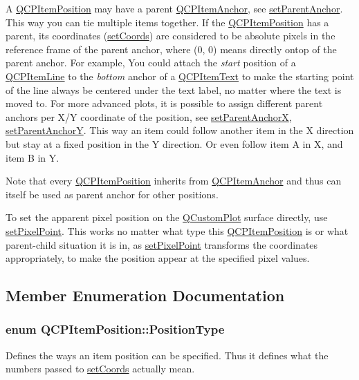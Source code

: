 \-A \hyperlink{classQCPItemPosition}{\-Q\-C\-P\-Item\-Position} may have a parent \hyperlink{classQCPItemAnchor}{\-Q\-C\-P\-Item\-Anchor}, see \hyperlink{classQCPItemPosition_ac094d67a95d2dceafa0d50b9db3a7e51}{set\-Parent\-Anchor}. \-This way you can tie multiple items together. \-If the \hyperlink{classQCPItemPosition}{\-Q\-C\-P\-Item\-Position} has a parent, its coordinates (\hyperlink{classQCPItemPosition_aa988ba4e87ab684c9021017dcaba945f}{set\-Coords}) are considered to be absolute pixels in the reference frame of the parent anchor, where (0, 0) means directly ontop of the parent anchor. \-For example, \-You could attach the {\itshape start\/} position of a \hyperlink{classQCPItemLine}{\-Q\-C\-P\-Item\-Line} to the {\itshape bottom\/} anchor of a \hyperlink{classQCPItemText}{\-Q\-C\-P\-Item\-Text} to make the starting point of the line always be centered under the text label, no matter where the text is moved to. \-For more advanced plots, it is possible to assign different parent anchors per \-X/\-Y coordinate of the position, see \hyperlink{classQCPItemPosition_add71461a973927c74e42179480916d9c}{set\-Parent\-Anchor\-X}, \hyperlink{classQCPItemPosition_add5ec1db9d19cec58a3b5c9e0a0c3f9d}{set\-Parent\-Anchor\-Y}. \-This way an item could follow another item in the \-X direction but stay at a fixed position in the \-Y direction. \-Or even follow item \-A in \-X, and item \-B in \-Y.

\-Note that every \hyperlink{classQCPItemPosition}{\-Q\-C\-P\-Item\-Position} inherits from \hyperlink{classQCPItemAnchor}{\-Q\-C\-P\-Item\-Anchor} and thus can itself be used as parent anchor for other positions.

\-To set the apparent pixel position on the \hyperlink{classQCustomPlot}{\-Q\-Custom\-Plot} surface directly, use \hyperlink{classQCPItemPosition_ab404e56d9ac2ac2df0382c57933a71ef}{set\-Pixel\-Point}. \-This works no matter what type this \hyperlink{classQCPItemPosition}{\-Q\-C\-P\-Item\-Position} is or what parent-\/child situation it is in, as \hyperlink{classQCPItemPosition_ab404e56d9ac2ac2df0382c57933a71ef}{set\-Pixel\-Point} transforms the coordinates appropriately, to make the position appear at the specified pixel values. 

\subsection{\-Member \-Enumeration \-Documentation}
\hypertarget{classQCPItemPosition_aad9936c22bf43e3d358552f6e86dbdc8}{
\subsubsection[{\-Position\-Type}]{\setlength{\rightskip}{0pt plus 5cm}enum {\bf \-Q\-C\-P\-Item\-Position\-::\-Position\-Type}}}\label{classQCPItemPosition_aad9936c22bf43e3d358552f6e86dbdc8}
\-Defines the ways an item position can be specified. \-Thus it defines what the numbers passed to \hyperlink{classQCPItemPosition_aa988ba4e87ab684c9021017dcaba945f}{set\-Coords} actually mean.

